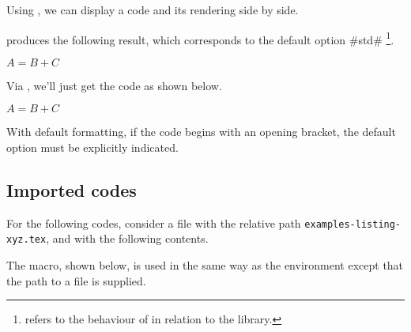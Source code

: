 \begin{tdocexa}
    Using , we can display a code and its rendering side by side.
\end{tdocexa}




\begin{tdocexa}[Following]
     produces the following result, which corresponds to the default option \tdocinlatex#std#
    \footnote{
         refers to the  behaviour of  in relation to the  library.
    }.

    \begin{tdoclatex}
        $A = B + C$
    \end{tdoclatex}
\end{tdocexa}




\begin{tdocexa}
    Via , we'll just get the code as shown below.

    \begin{tdoclatex}[code]
        $A = B + C$
    \end{tdoclatex}
\end{tdocexa}




\begin{tdocwarn}
    With default formatting, if the code begins with an opening bracket, the default option must be explicitly indicated.
\end{tdocwarn}


\subsection{Imported codes}

For the following codes, consider a file with the relative path \verb+examples-listing-xyz.tex+, and with the following contents.


\medskip

The  macro, shown below, is used in the same way as the  environment except that the path to a file is supplied.


